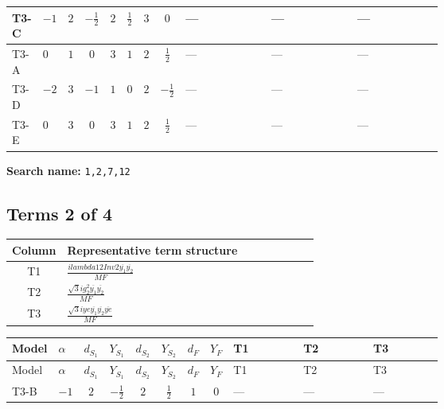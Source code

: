 \documentclass[8pt]{article}
\begin{document}
\begin{landscape}
\begin{longtable}{@{}llcccccc >{\raggedright\arraybackslash}p{0.21\linewidth} >{\raggedright\arraybackslash}p{0.21\linewidth} >{\raggedright\arraybackslash}p{0.21\linewidth}@{}}
\midrule
T3-C & $-1$ & $2$ & $-\frac{1}{2}$ & $2$ & $\frac{1}{2}$ & $3$ & $0$ & --- & --- & --- \\
\midrule
T3-A & $0$ & $1$ & $0$ & $3$ & $1$ & $2$ & $\frac{1}{2}$ & --- & --- & --- \\
\midrule
T3-D & $-2$ & $3$ & $-1$ & $1$ & $0$ & $2$ & $-\frac{1}{2}$ & --- & --- & --- \\
\midrule
T3-E & $0$ & $3$ & $0$ & $3$ & $1$ & $2$ & $\frac{1}{2}$ & --- & --- & --- \\
\midrule
\bottomrule
\end{longtable}
\clearpage
\noindent\textbf{Search name: }\texttt{1,2,7,12}\par\smallskip
\subsection*{Terms 2 of 4}
\begin{center}
\begin{tabular}{@{}c >{\raggedright\arraybackslash}p{0.82\linewidth}@{}}
\toprule
Column & Representative term structure \\
\midrule
T1 & \(\displaystyle \frac{i lambda12Inv2 \overline{y_{1}} \overline{y_{2}}}{MF}\) \\
\midrule
T2 & \(\displaystyle \frac{\sqrt{3} i g_{2}^{2} \overline{y_{1}} \overline{y_{2}}}{MF}\) \\
\midrule
T3 & \(\displaystyle \frac{\sqrt{3} i ye \overline{y_{1}} \overline{y_{2}} \overline{ye}}{MF}\) \\
\midrule
\bottomrule
\end{tabular}
\end{center}
\smallskip
\tiny
\begin{longtable}{@{}llcccccc >{\raggedright\arraybackslash}p{0.21\linewidth} >{\raggedright\arraybackslash}p{0.21\linewidth} >{\raggedright\arraybackslash}p{0.21\linewidth}@{}}
\toprule
Model & $\alpha$ & $d_{S_1}$ & $Y_{S_1}$ & $d_{S_2}$ & $Y_{S_2}$ & $d_F$ & $Y_F$ & T1 & T2 & T3 \\
\midrule
\endfirsthead
\toprule
Model & $\alpha$ & $d_{S_1}$ & $Y_{S_1}$ & $d_{S_2}$ & $Y_{S_2}$ & $d_F$ & $Y_F$ & T1 & T2 & T3 \\
\midrule
\endhead
T3-B & $-1$ & $2$ & $-\frac{1}{2}$ & $2$ & $\frac{1}{2}$ & $1$ & $0$ & --- & --- & --- \\
\midrule

\end{longtable}
\end{landscape}
\end{document}
